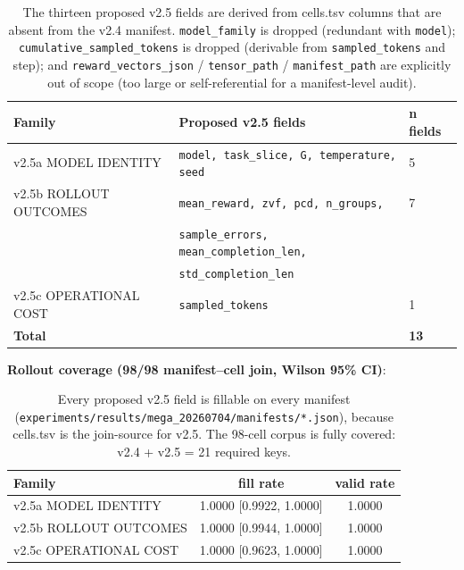 \documentclass{article}  \usepackage[preprint,nonatbib]{neurips_2026} \usepackage[numbers]{natbib}
\begin{document}
\begin{table}[h]
\centering\small
\begin{tabular}{lll}
\hline
\textbf{Family} & \textbf{Proposed v2.5 fields} & \textbf{n fields} \\
\hline
v2.5a MODEL IDENTITY       & \texttt{model, task\_slice, G, temperature, seed}        & 5 \\
v2.5b ROLLOUT OUTCOMES     & \texttt{mean\_reward, zvf, pcd, n\_groups,}             & 7 \\
                            & \texttt{sample\_errors, mean\_completion\_len,}          &   \\
                            & \texttt{std\_completion\_len}                           &   \\
v2.5c OPERATIONAL COST     & \texttt{sampled\_tokens}                                & 1 \\
\hline
\textbf{Total} & & \textbf{13} \\
\hline
\end{tabular}
\caption{The thirteen proposed v2.5 fields are derived from cells.tsv
columns that are absent from the v2.4 manifest. \texttt{model\_family}
is dropped (redundant with \texttt{model}); \texttt{cumulative\_sampled\_tokens}
is dropped (derivable from \texttt{sampled\_tokens} and step); and
\texttt{reward\_vectors\_json} / \texttt{tensor\_path} / \texttt{manifest\_path}
are explicitly out of scope (too large or self-referential for a manifest-level audit).}
\label{tab:p5-v25-fields}
\end{table}

\noindent\textbf{Rollout coverage (98/98 manifest--cell join, Wilson 95\% CI)}:

\begin{table}[h]
\centering\small
\begin{tabular}{lcc}
\hline
\textbf{Family} & \textbf{fill rate} & \textbf{valid rate} \\
\hline
v2.5a MODEL IDENTITY       & 1.0000 [0.9922, 1.0000] & 1.0000 \\
v2.5b ROLLOUT OUTCOMES     & 1.0000 [0.9944, 1.0000] & 1.0000 \\
v2.5c OPERATIONAL COST     & 1.0000 [0.9623, 1.0000] & 1.0000 \\
\hline
\end{tabular}
\caption{Every proposed v2.5 field is fillable on every manifest
(\texttt{experiments/results/mega\_20260704/manifests/*.json}),
because cells.tsv is the join-source for v2.5. The 98-cell
corpus is fully covered: v2.4 + v2.5 = 21 required keys.}
\label{tab:p5-v25-rollout-fill}
\end{table}
\end{document}
